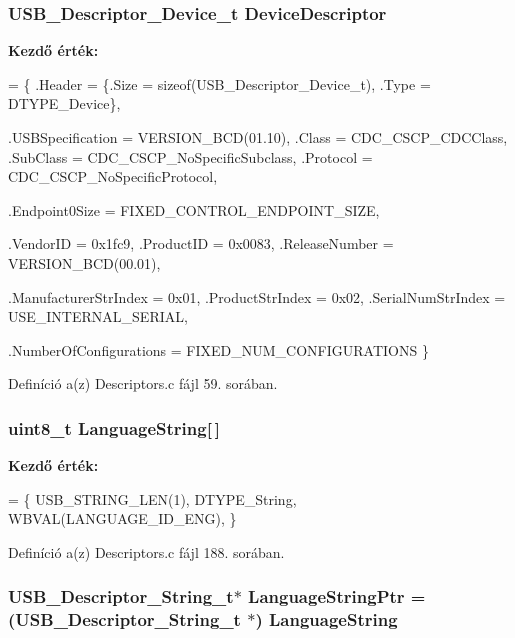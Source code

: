 \subsubsection[{Device\-Descriptor}]{\setlength{\rightskip}{0pt plus 5cm}U\-S\-B\-\_\-\-Descriptor\-\_\-\-Device\-\_\-t Device\-Descriptor}\label{_descriptors_8c_a6a373a28a14fd420dd82bdd0f6978544}
{\bfseries Kezdő érték\-:}
\begin{DoxyCode}
= \{
    .Header                 = \{.Size = \textcolor{keyword}{sizeof}(USB\_Descriptor\_Device\_t), .Type = DTYPE\_Device\},

    .USBSpecification       = VERSION\_BCD(01.10),
    .Class                  = CDC\_CSCP\_CDCClass,
    .SubClass               = CDC\_CSCP\_NoSpecificSubclass,
    .Protocol               = CDC\_CSCP\_NoSpecificProtocol,

    .Endpoint0Size          = FIXED\_CONTROL\_ENDPOINT\_SIZE,

    .VendorID               = 0x1fc9,   
    .ProductID              = 0x0083,   
    .ReleaseNumber          = VERSION\_BCD(00.01),

    .ManufacturerStrIndex   = 0x01,
    .ProductStrIndex        = 0x02,
    .SerialNumStrIndex      = USE\_INTERNAL\_SERIAL,

    .NumberOfConfigurations = FIXED\_NUM\_CONFIGURATIONS
\}
\end{DoxyCode}


Definíció a(z) Descriptors.\-c fájl 59. sorában.

\subsubsection[{Language\-String}]{\setlength{\rightskip}{0pt plus 5cm}uint8\-\_\-t Language\-String[$\,$]}\label{_descriptors_8c_a156d44ced236ce8b684a10b2ebb9cd70}
{\bfseries Kezdő érték\-:}
\begin{DoxyCode}
= \{
    USB\_STRING\_LEN(1),
    DTYPE\_String,
    WBVAL(LANGUAGE\_ID\_ENG),
\}
\end{DoxyCode}


Definíció a(z) Descriptors.\-c fájl 188. sorában.

\subsubsection[{Language\-String\-Ptr}]{\setlength{\rightskip}{0pt plus 5cm}U\-S\-B\-\_\-\-Descriptor\-\_\-\-String\-\_\-t$\ast$ Language\-String\-Ptr = (U\-S\-B\-\_\-\-Descriptor\-\_\-\-String\-\_\-t $\ast$) {\bf Language\-String}}\label{_descriptors_8c_a9f3f62928cb9d5d2ca9fbf5eede1cc52}


